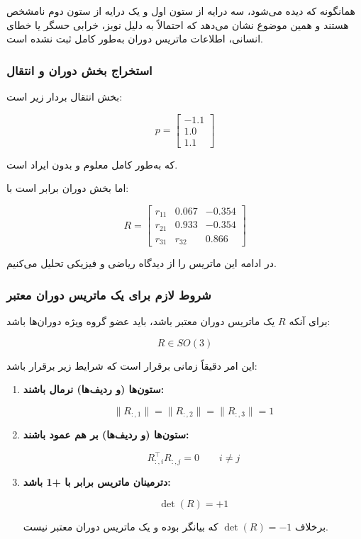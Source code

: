 \documentclass{article}
\begin{document}
همانگونه که دیده می‌شود، سه درایه از ستون اول و یک درایه از ستون دوم نامشخص هستند و همین موضوع نشان می‌دهد که احتمالاً به دلیل نویز، خرابی حسگر یا خطای انسانی، اطلاعات ماتریس دوران به‌طور کامل ثبت نشده است.

\subsubsection{استخراج بخش دوران و انتقال}
بخش انتقال بردار زیر است:

\[
p = 
\begin{bmatrix}
	-1.1 \\
	1.0 \\
	1.1
\end{bmatrix}
\]

که به‌طور کامل معلوم و بدون ایراد است.

اما بخش دوران برابر است با:

\[
R =
\begin{bmatrix}
	r_{11} & 0.067 & -0.354 \\
	r_{21} & 0.933 & -0.354 \\
	r_{31} & r_{32} & 0.866
\end{bmatrix}
\]

در ادامه این ماتریس را از دیدگاه ریاضی و فیزیکی تحلیل می‌کنیم.

\subsubsection{ شروط لازم برای یک ماتریس دوران معتبر}
برای آنکه $R$ یک ماتریس دوران معتبر باشد، باید عضو گروه ویژه دوران‌ها باشد:

\[
R \in SO(3)
\]

این امر دقیقاً زمانی برقرار است که شرایط زیر برقرار باشد:

\begin{enumerate}
	\item \textbf{ستون‌ها (و ردیف‌ها) نرمال باشند:}
	
	\[
	\|R_{:,1}\| = \|R_{:,2}\| = \|R_{:,3}\| = 1
	\]
	
	\item \textbf{ستون‌ها (و ردیف‌ها) بر هم عمود باشند:}
	
	\[
	R_{:,i}^\top R_{:,j} = 0 \qquad i \neq j
	\]
	
	\item \textbf{دترمینان ماتریس برابر با +1 باشد:}
	
	\[
	\det(R) = +1
	\]
	
	برخلاف $\det(R) = -1$ که بیانگر  بوده و یک ماتریس دوران معتبر نیست.
\end{enumerate}
\end{document}
